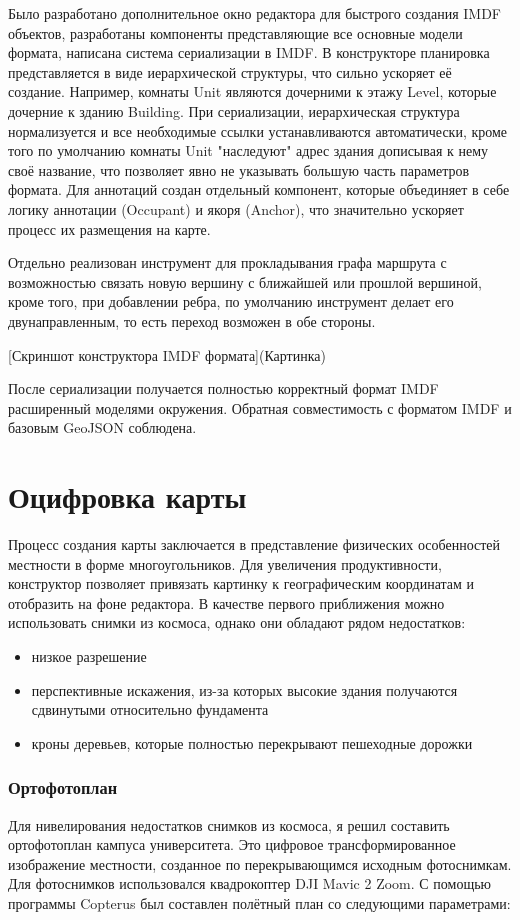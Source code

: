     Было разработано дополнительное окно редактора для быстрого создания IMDF объектов, разработаны компоненты представляющие все основные модели формата, написана система сериализации в IMDF. В конструкторе планировка представляется в виде иерархической структуры, что сильно ускоряет её создание. Например, комнаты Unit являются дочерними к этажу Level, которые дочерние к зданию Building. При сериализации, иерархическая структура нормализуется и все необходимые ссылки устанавливаются автоматически, кроме того по умолчанию комнаты Unit "наследуют" адрес здания дописывая к нему своё название, что позволяет явно не указывать большую часть параметров формата. Для аннотаций создан отдельный компонент, которые объединяет в себе логику аннотации (Occupant) и якоря (Anchor), что значительно ускоряет процесс их размещения на карте.

    Отдельно реализован инструмент для прокладывания графа маршрута с возможностью связать новую вершину с ближайшей или прошлой вершиной, кроме того, при добавлении ребра, по умолчанию инструмент делает его двунаправленным, то есть переход возможен в обе стороны.

    [Скриншот конструктора IMDF формата](Картинка)

    После сериализации получается полностью корректный формат IMDF расширенный моделями окружения. Обратная совместимость с форматом IMDF и базовым GeoJSON соблюдена.

  \section{Оцифровка карты}
    Процесс создания карты заключается в представление физических особенностей местности в форме многоугольников. Для увеличения продуктивности, конструктор позволяет привязать картинку к географическим координатам и отобразить на фоне редактора. В качестве первого приближения можно использовать снимки из космоса, однако они обладают рядом недостатков:
    \begin{itemize}
      \item низкое разрешение
      \item перспективные искажения, из-за которых высокие здания получаются сдвинутыми относительно фундамента
      \item кроны деревьев, которые полностью перекрывают пешеходные дорожки
    \end{itemize}

    \subsubsection{Ортофотоплан}
      Для нивелирования недостатков снимков из космоса, я решил составить ортофотоплан кампуса университета. Это цифровое трансформированное изображение местности, созданное по перекрывающимся исходным фотоснимкам. Для фотоснимков использовался квадрокоптер DJI Mavic 2 Zoom.
      С помощью программы Copterus \cite{Copterus} был составлен полётный план со следующими параметрами:


